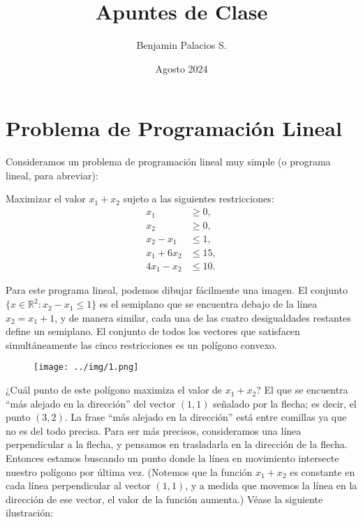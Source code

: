 \documentclass{article}
\title{Apuntes de Clase}
\author{Benjamin Palacios S.}
\date{Agosto 2024}
\begin{document}
\maketitle

\renewcommand{\contentsname}{Contenido}

\tableofcontents   %
\newpage
\section{Problema de Programación Lineal}


Consideramos un problema de programación lineal muy simple (o programa lineal, para abreviar):

Maximizar el valor \( x_1 + x_2 \) sujeto a las siguientes restricciones:
\begin{align*}
x_1 &\geq 0, \\
x_2 &\geq 0, \\
x_2 - x_1 &\leq 1, \\
x_1 + 6x_2 &\leq 15, \\
4x_1 - x_2 &\leq 10.
\end{align*}

Para este programa lineal, podemos dibujar fácilmente una imagen. El conjunto \(\{x \in \mathbb{R}^2 : x_2 - x_1 \leq 1\}\) es el semiplano que se encuentra debajo de la línea \(x_2 = x_1 + 1\), y de manera similar, cada una de las cuatro desigualdades restantes define un semiplano. El conjunto de todos los vectores que satisfacen simultáneamente las cinco restricciones es un polígono convexo.

\begin{figure}[H] %
\centering %
\texttt{[image: ../img/1.png]} %
\label{fig:imagen} %
\end{figure}
¿Cuál punto de este polígono maximiza el valor de \( x_1 + x_2 \)? El que se encuentra “más alejado en la dirección” del vector \( (1, 1) \) señalado por la flecha; es decir, el punto \( (3, 2) \). La frase “más alejado en la dirección” está entre comillas ya que no es del todo precisa. Para ser más precisos, consideramos una línea perpendicular a la flecha, y pensamos en trasladarla en la dirección de la flecha. Entonces estamos buscando un punto donde la línea en movimiento intersecte nuestro polígono por última vez. (Notemos que la función \( x_1 + x_2 \) es constante en cada línea perpendicular al vector \( (1, 1) \), y a medida que movemos la línea en la dirección de ese vector, el valor de la función aumenta.) Véase la siguiente ilustración:
\end{document}
